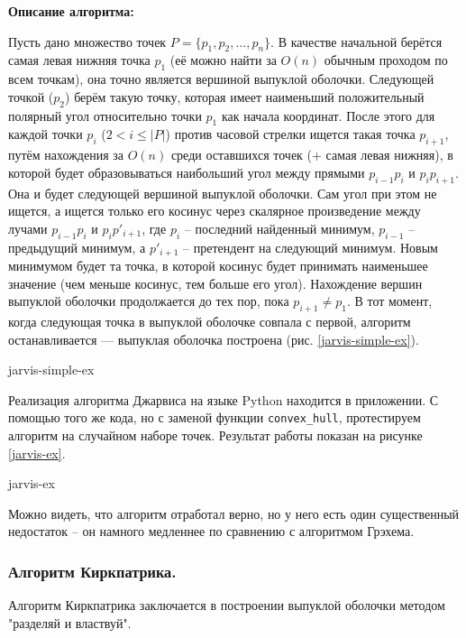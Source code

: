 {\bf Описание алгоритма:}

Пусть дано множество точек $P = \{p_1, p_2, \ldots, p_n\}$. В качестве
начальной берётся самая левая нижняя точка $p_1$ (её можно найти за
$O(n)$ обычным проходом по всем точкам), она точно является вершиной
выпуклой оболочки. Следующей точкой ($p_2$) берём такую точку, 
которая имеет наименьший положительный полярный угол относительно точки
$p_1$ как начала координат. После этого для каждой точки $p_i$ 
($2 < i \leq |P|$) против часовой стрелки ищется такая точка $p_{i+1}$,
путём нахождения за $O(n)$ среди оставшихся точек 
(+ самая левая нижняя),
в которой будет образовываться наибольший угол между прямыми 
$p_{i-1}p_i$ и $p_ip_{i+1}$. Она и будет следующей вершиной выпуклой
оболочки. Сам угол при этом не ищется, а ищется только его косинус 
через скалярное произведение между лучами $p_{i-1}p_i$ и 
$p_ip'_{i+1}$, где $p_i$ -- последний найденный минимум, $p_{i-1}$ -- 
предыдущий минимум, а $p'_{i+1}$ -- претендент на следующий минимум.
Новым минимумом будет та точка, в которой косинус будет принимать
наименьшее значение (чем меньше косинус, тем больше его угол).
Нахождение вершин выпуклой оболочки продолжается до тех пор, пока 
$p_{i+1} \neq p_1$. В тот момент, когда следующая точка в выпуклой
оболочке совпала с первой, алгоритм останавливается — выпуклая оболочка
построена (рис. \ref{jarvis-simple-ex}).

{jarvis-simple-ex}

Реализация алгоритма Джарвиса на языке Python находится в приложении.
С помощью того же кода, но с заменой функции {\tt convex\_hull},
протестируем алгоритм на случайном наборе точек. Результат работы
показан на рисунке \ref{jarvis-ex}.

{jarvis-ex}

Можно видеть, что алгоритм отработал верно, но у него есть один 
существенный недостаток -- он намного медленнее по сравнению с 
алгоритмом Грэхема.

\subsubsection{Алгоритм Киркпатрика.}

Алгоритм Киркпатрика \cite{kirkpatrick} заключается в построении
выпуклой оболочки методом "разделяй и властвуй".

